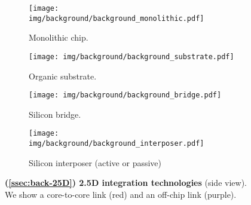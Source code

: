 \begin{figure*}[h]
\centering
\captionsetup{justification=centering}
%
\begin{subfigure}{0.22 \textwidth}
\centering
\texttt{[image: img/background/background\_monolithic.pdf]}
\caption{Monolithic chip.}
\label{fig:back-monolithic}
\end{subfigure}
%
\begin{subfigure}{0.22 \textwidth}
\centering
\texttt{[image: img/background/background\_substrate.pdf]}
\caption{Organic substrate.}
\label{fig:back-substrate}
\end{subfigure}
%
\begin{subfigure}{0.22 \textwidth}
\centering
\texttt{[image: img/background/background\_bridge.pdf]}
\caption{Silicon bridge.}
\label{fig:back-bridge}
\end{subfigure}
%
\begin{subfigure}{0.3 \textwidth}
\centering
\texttt{[image: img/background/background\_interposer.pdf]}
\caption{Silicon interposer (active or passive)}
\label{fig:back-interposer}
\end{subfigure}
%
\caption{\textbf{(\textsection \ref{ssec:back-25D}) 2.5D integration technologies} (side view). We show a core-to-core link (red) and an off-chip link (purple).}
\label{fig:back-integration}
\end{figure*}
